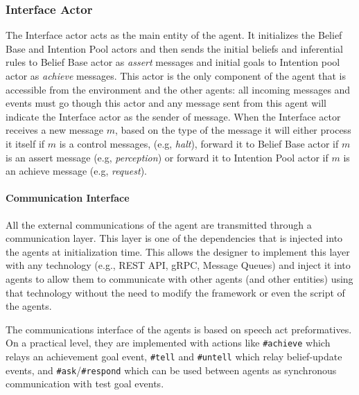 \subsubsection{Interface Actor}
The Interface actor acts as the main entity of the agent. It initializes the Belief Base and Intention Pool actors and then sends the initial beliefs and inferential rules to Belief Base actor as \textit{assert} messages and initial goals to Intention pool actor as \textit{achieve} messages. This actor is the only component of the agent that is accessible from the environment and the other agents: all incoming messages and events must go though this actor and any message sent from this agent will indicate the Interface actor as the sender of message. When the Interface actor receives a new message $m$, based on the type of the message it will either process it itself if $m$ is a control messages, (e.g, \textit{halt}), forward it to Belief Base actor if $m$ is an assert message (e.g, \textit{perception}) or forward it to Intention Pool actor if $m$ is an achieve message (e.g, \textit{request}).


\paragraph{Communication Interface}
All the external communications of the agent are transmitted through a communication layer. This layer is one of the dependencies that is injected into the agents at initialization time. This allows the designer to implement this layer with any technology (e.g., REST API, gRPC, Message Queues) and inject it into agents to allow them to communicate with other agents (and other entities) using that technology without the need to modify the framework or even the script of the agents.

The communications interface of the agents is based on speech act preformatives. On a practical level, they are implemented with actions like \texttt{#achieve} which relays an achievement goal event, \texttt{#tell} and \texttt{#untell} which relay belief-update events, and \texttt{#ask}/\texttt{#respond} which can be used between agents as synchronous communication with test goal events.


